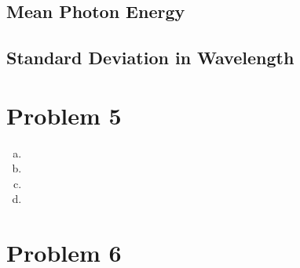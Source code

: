 \documentclass[11pt]{article} %
\begin{document}
\subsection*{Mean Photon Energy}
\subsection*{Standard Deviation in Wavelength}


\section*{Problem 5}
\begin{enumerate}[a.)]
\item
\item
\item
\item
\end{enumerate}

\section*{Problem 6}
\end{document}
